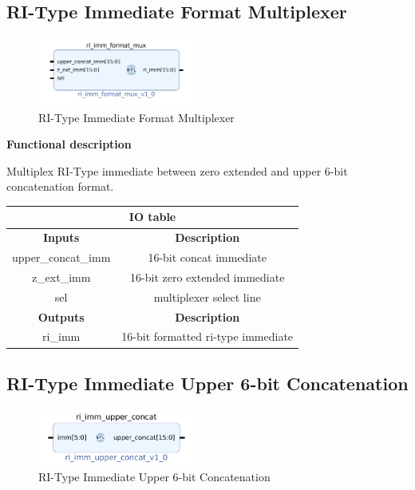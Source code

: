 \documentclass{article}
\begin{document}
\begin{par}
	\newpage
	
	\subsection{RI-Type Immediate Format Multiplexer}
	
	\begin{figure}[H]
		\centering
		\includegraphics[width=2in]{img/riImmF.png}
		\caption{RI-Type Immediate Format Multiplexer}
	\end{figure}
	
	\textbf{Functional description}
	\begin{par}
		Multiplex RI-Type immediate between zero extended and upper 6-bit concatenation format. 
	\end{par}
	
	\begin{center}
		\begin{tabular}{|c|c|}
			\hline 
			\multicolumn{2}{|c|}{\textbf{IO table}} \\
			\hline 
			\textbf{Inputs} & \textbf{Description} \\ 
			\hline 
			upper\_concat\_imm & 16-bit concat immediate \\ 
			\hline 
			z\_ext\_imm & 16-bit zero extended immediate \\ 
			\hline 
			sel & multiplexer select line \\ 
			\hline 
			\textbf{Outputs} & \textbf{Description} \\ 
			\hline 
			ri\_imm & 16-bit formatted ri-type immediate \\
			\hline
		\end{tabular}
	\end{center}

	\subsection{RI-Type Immediate Upper 6-bit Concatenation}
	
	\begin{figure}[H]
		\centering
		\includegraphics[width=2in]{img/upcon.png}
		\caption{RI-Type Immediate Upper 6-bit Concatenation}
	\end{figure}
	

\end{par}
\end{document}
